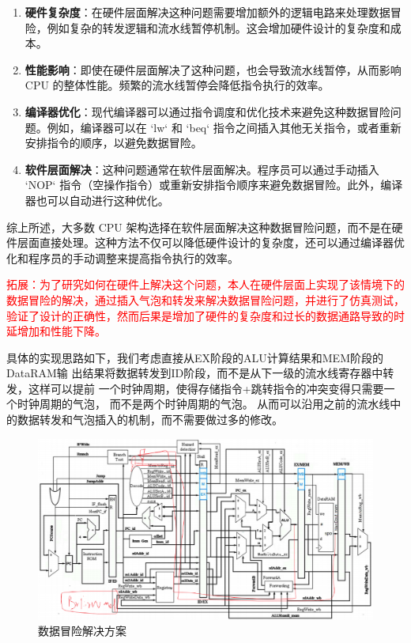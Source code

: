 \documentclass[12pt,hyperref,a4paper,UTF8]{ctexart}
\begin{document}
\begin{enumerate}
    \item \textbf{硬件复杂度}：在硬件层面解决这种问题需要增加额外的逻辑电路来处理数据冒险，例如复杂的转发逻辑和流水线暂停机制。这会增加硬件设计的复杂度和成本。
    \item \textbf{性能影响}：即使在硬件层面解决了这种问题，也会导致流水线暂停，从而影响 CPU 的整体性能。频繁的流水线暂停会降低指令执行的效率。
    \item \textbf{编译器优化}：现代编译器可以通过指令调度和优化技术来避免这种数据冒险问题。例如，编译器可以在 `lw` 和 `beq` 指令之间插入其他无关指令，或者重新安排指令的顺序，以避免数据冒险。
    \item \textbf{软件层面解决}：这种问题通常在软件层面解决。程序员可以通过手动插入 `NOP` 指令（空操作指令）或重新安排指令顺序来避免数据冒险。此外，编译器也可以自动进行这种优化。
\end{enumerate}

综上所述，大多数 CPU 架构选择在软件层面解决这种数据冒险问题，而不是在硬件层面直接处理。这种方法不仅可以降低硬件设计的复杂度，还可以通过编译器优化和程序员的手动调整来提高指令执行的效率。

\textcolor{red}{拓展：为了研究如何在硬件上解决这个问题，本人在硬件层面上实现了该情境下的数据冒险的解决，通过插入气泡和转发来解决数据冒险问题，并进行了仿真测试，验证了设计的正确性，然而后果是增加了硬件的复杂度和过长的数据通路导致的时延增加和性能下降。}

具体的实现思路如下，我们考虑直接从EX阶段的ALU计算结果和MEM阶段的DataRAM输
出结果将数据转发到ID阶段，而不是从下一级的流水线寄存器中转发，这样可以提前
一个时钟周期，使得存储指令+跳转指令的冲突变得只需要一个时钟周期的气泡，
而不是两个时钟周期的气泡。
从而可以沿用之前的流水线中的数据转发和气泡插入的机制，而不需要做过多的修改。
    \begin{figure}[H]
        \centering
        \includegraphics[width=1\textwidth]{figures/fig/image24.png}
        \caption{数据冒险解决方案}
    \end{figure}
\end{document}
